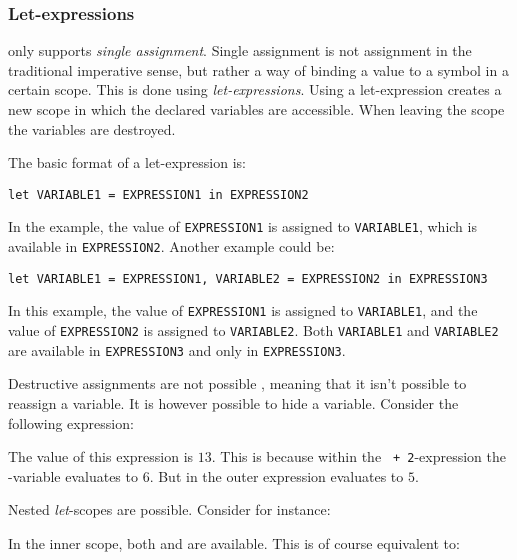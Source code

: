 \subsubsection{Let-expressions}

\productname{} only supports \emph{single assignment}. Single assignment is not assignment
in the traditional imperative sense, but rather a way of binding a value to a symbol in a
certain scope. This is done using \emph{let-expressions}. Using a let-expression creates a
new scope in which the declared variables are accessible. When leaving the scope the
variables are destroyed.

The basic format of a let-expression is:

\texttt{let VARIABLE1 = EXPRESSION1 in EXPRESSION2}

In the example, the value of \texttt{EXPRESSION1} is assigned to \texttt{VARIABLE1}, which
is available in \texttt{EXPRESSION2}. Another example could be:

\texttt{let VARIABLE1 = EXPRESSION1, VARIABLE2 = EXPRESSION2 in EXPRESSION3}

In this example, the value of \texttt{EXPRESSION1} is assigned to \texttt{VARIABLE1}, and
the value of \texttt{EXPRESSION2} is assigned to \texttt{VARIABLE2}. Both \texttt{VARIABLE1}
and \texttt{VARIABLE2} are available in \texttt{EXPRESSION3} and only in \texttt{EXPRESSION3}.

Destructive assignments are not possible \productname{}, meaning that it isn't possible to 
reassign a variable. It is however possible to hide a variable.
Consider the following expression:


The value of this expression is $13$. This is because within the \texttt{ + 2}-expression
the -variable evaluates to $6$. But in the outer expression  evaluates to
$5$.

Nested \emph{let}-scopes are possible. Consider for instance:


In the inner scope, both  and  are available. This is of course equivalent
to:










%
%
%
%
%
%
%
%
